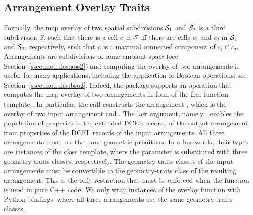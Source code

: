 \subsection{Arrangement Overlay Traits}
\label{sec:code:overlay}
Formally, the map overlay of two spatial subdivisions ${\cal S}_1$ and
${\cal S}_2$ is a third subdivision $S$, such that there is a cell $c$ in
${\cal S}$ iff there are cells $c_1$ and $c_2$ in ${\cal S}_1$ and
${\cal S}_2$, respectively, such that $c$ is a maximal connected
component of $c_1 \cap c_2$. Arrangements are subdivisions of some
ambient space (see Section~\ref{ssec:modules:aos2}) and computing the
overlay of two arrangements is useful for many applications, including
the application of Boolean operations; see
Section~\ref{ssec:modules:bso2}. Indeed, the \iiDArrangementsPackage{}
\cgal{} package supports an operation that computes the map overlay of
two arrangements in form of the free function template
. In particular, the call
 constructs
the arrangement , which is the overlay of two
input arrangement  and . The
last argument, namely , enables the population of
properies in the extended DCEL records of the output arrangement from
properties of the DCEL records of the input arrangements. All three
arrangements must use the same geometric primitives.  In other words,
their types are instances of the  class template, where the  parameter is
substituted with three geometry-traits classes, respectively. The
geometry-traits classes of the input arrangements must be convertible
to the geometry-traits class of the resulting arrangement. This is the
only restriction that must be enforced when the function is used in
pure C++ code.  We only wrap instances of the overlay function with
Python bindings, where all three arrangements use the same
geometry-traits classes.

